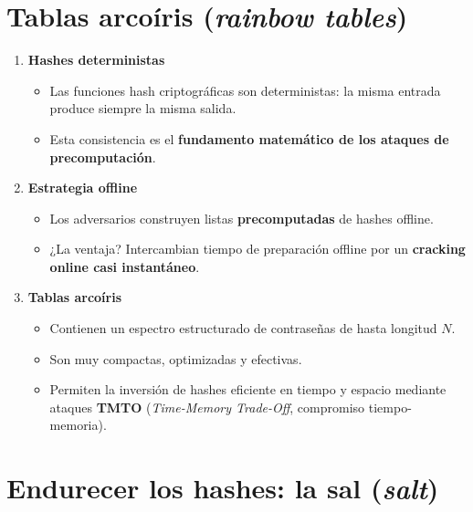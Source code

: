 \documentclass[11pt,a4paper]{report}
\begin{document}
\section{Tablas arcoíris (\emph{rainbow tables})}
 
\begin{enumerate}
  \item \textbf{Hashes deterministas}
    \begin{itemize}
      \item Las funciones hash criptográficas son deterministas: la misma entrada produce siempre la misma salida.
      \item Esta consistencia es el \textbf{fundamento matemático de los ataques de precomputación}.
    \end{itemize}
  \item \textbf{Estrategia offline}
    \begin{itemize}
      \item Los adversarios construyen listas \textbf{precomputadas} de hashes offline.
      \item ¿La ventaja? Intercambian tiempo de preparación offline por un \textbf{cracking online casi instantáneo}.
    \end{itemize}
  \item \textbf{Tablas arcoíris}
    \begin{itemize}
      \item Contienen un espectro estructurado de contraseñas de hasta longitud $N$.
      \item Son muy compactas, optimizadas y efectivas.
      \item Permiten la inversión de hashes eficiente en tiempo y espacio mediante ataques \textbf{TMTO} (\emph{Time-Memory Trade-Off}, compromiso tiempo-memoria).
    \end{itemize}
\end{enumerate}
 
\section{Endurecer los hashes: la sal (\emph{salt})}
 
\end{document}
